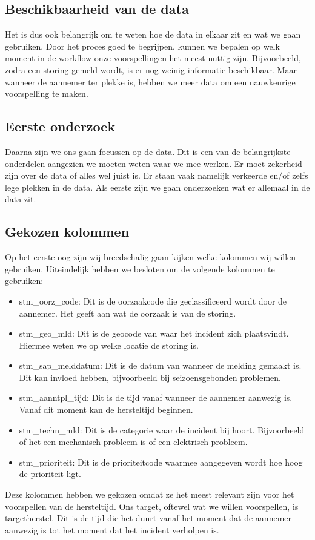 \documentclass{article}
\begin{document}
\subsection{Beschikbaarheid van de data}
Het is dus ook belangrijk om te weten hoe de data in elkaar zit en wat we gaan gebruiken. Door het proces goed te begrijpen, kunnen we bepalen op welk moment in de workflow onze voorspellingen het meest nuttig zijn. Bijvoorbeeld, zodra een storing gemeld wordt, is er nog weinig informatie beschikbaar. Maar wanneer de aannemer ter plekke is, hebben we meer data om een nauwkeurige voorspelling te maken.

\subsection{Eerste onderzoek}
Daarna zijn we ons gaan focussen op de data. Dit is een van de belangrijkste onderdelen aangezien we moeten weten waar we mee werken. Er moet zekerheid zijn over de data of alles wel juist is. Er staan vaak namelijk verkeerde en/of zelfs lege plekken in de data. Als eerste zijn we gaan onderzoeken wat er allemaal in de data zit.

\subsection{Gekozen kolommen}
Op het eerste oog zijn wij breedschalig gaan kijken welke kolommen wij willen gebruiken. Uiteindelijk hebben we besloten om de volgende kolommen te gebruiken:
\begin{itemize}
    \item stm\_oorz\_code: Dit is de oorzaakcode die geclassificeerd wordt door de aannemer. Het geeft aan wat de oorzaak is van de storing.
    \item stm\_geo\_mld: Dit is de geocode van waar het incident zich plaatsvindt. Hiermee weten we op welke locatie de storing is.
    \item stm\_sap\_melddatum: Dit is de datum van wanneer de melding gemaakt is. Dit kan invloed hebben, bijvoorbeeld bij seizoensgebonden problemen.
    \item stm\_aanntpl\_tijd: Dit is de tijd vanaf wanneer de aannemer aanwezig is. Vanaf dit moment kan de hersteltijd beginnen.
    \item stm\_techn\_mld: Dit is de categorie waar de incident bij hoort. Bijvoorbeeld of het een mechanisch probleem is of een elektrisch probleem.
    \item stm\_prioriteit: Dit is de prioriteitcode waarmee aangegeven wordt hoe hoog de prioriteit ligt.
\end{itemize}
Deze kolommen hebben we gekozen omdat ze het meest relevant zijn voor het voorspellen van de hersteltijd. Ons target, oftewel wat we willen voorspellen, is targetherstel. Dit is de tijd die het duurt vanaf het moment dat de aannemer aanwezig is tot het moment dat het incident verholpen is.
\end{document}
